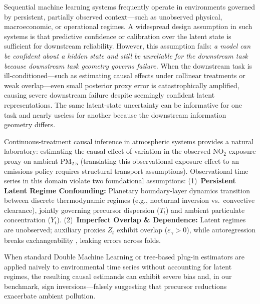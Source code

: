 \documentclass[twoside]{article}
\theoremstyle{definition}
\begin{document}
Sequential machine learning systems frequently operate in environments governed by persistent, partially observed context—such as unobserved physical, macroeconomic, or operational regimes. A widespread design assumption in such systems is that predictive confidence or calibration over the latent state is sufficient for downstream reliability. However, this assumption fails: \emph{a model can be confident about a hidden state and still be unreliable for the downstream task because downstream task geometry governs failure.} When the downstream task is ill-conditioned—such as estimating causal effects under collinear treatments or weak overlap—even small posterior proxy error is catastrophically amplified, causing severe downstream failure despite seemingly confident latent representations. The same latent-state uncertainty can be informative for one task and nearly useless for another because the downstream information geometry differs.

Continuous-treatment causal inference in atmospheric systems provides a natural laboratory: estimating the causal effect of variation in the observed $\text{NO}_2$ exposure proxy on ambient $\text{PM}_{2.5}$ \citep{dominici2014mitigating} (translating this observational exposure effect to an emissions policy requires structural transport assumptions). Observational time series in this domain violate two foundational assumptions: (1)~\textbf{Persistent Latent Regime Confounding:} Planetary boundary-layer dynamics transition between discrete thermodynamic regimes (e.g., nocturnal inversion vs.\ convective clearance), jointly governing precursor dispersion ($T_t$) and ambient particulate concentration ($Y_t$). (2)~\textbf{Imperfect Overlap \& Dependence:} Latent regimes are unobserved; auxiliary proxies $Z_t$ exhibit overlap ($\varepsilon_\gamma > 0$), while autoregression breaks exchangeability \citep{chernozhukov2018double}, leaking errors across folds.

When standard Double Machine Learning \citep{chernozhukov2018double} or tree-based plug-in estimators are applied naively to environmental time series without accounting for latent regimes, the resulting causal estimands can exhibit severe bias and, in our benchmark, sign inversions—falsely suggesting that precursor reductions exacerbate ambient pollution.
\end{document}
